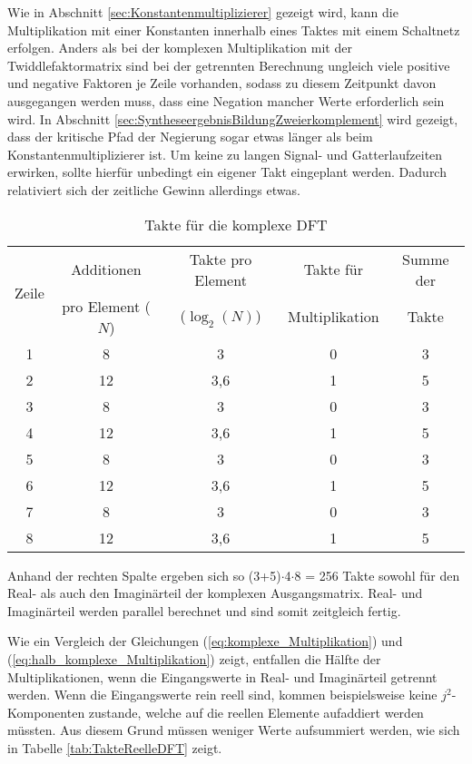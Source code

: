 Wie in Abschnitt \ref{sec:Konstantenmultiplizierer} gezeigt wird, kann die Multiplikation mit einer Konstanten innerhalb eines Taktes mit einem Schaltnetz erfolgen. 
Anders als bei der komplexen Multiplikation mit der Twiddlefaktormatrix sind bei der getrennten Berechnung ungleich viele positive und negative Faktoren je Zeile vorhanden, 
sodass zu diesem Zeitpunkt davon ausgegangen werden muss, dass eine Negation mancher Werte erforderlich sein wird. In Abschnitt
\ref{sec:SyntheseergebnisBildungZweierkomplement} wird gezeigt, dass der kritische Pfad der Negierung sogar etwas länger als beim Konstantenmultiplizierer ist.
Um keine zu langen Signal- und Gatterlaufzeiten erwirken, sollte hierfür unbedingt ein eigener Takt eingeplant werden. Dadurch relativiert sich der zeitliche Gewinn allerdings 
etwas. 


\begin{table}[htbp]
\centering
\caption{Takte für die komplexe DFT}
\label{tab:TakteKomplexeDFT}
\begin{tabular}{ccccc}
\hline
\multirow{2}{*}{Zeile} & Additionen & Takte pro Element & Takte für & Summe der\\
      & pro Element ($N$) & ($\log_2(N)$) & Multiplikation & Takte\\
\hline
 1& 8  & 3   &0 &3\\
 2& 12 & 3,6 &1 &5\\
 3& 8  & 3   &0 &3\\
 4& 12 & 3,6 &1 &5\\
 5& 8  & 3   &0 &3\\
 6& 12 & 3,6 &1 &5\\
 7& 8  & 3   &0 &3\\
 8& 12 & 3,6 &1 &5\\
\hline
\end{tabular}
\end{table}

Anhand der rechten Spalte ergeben sich so (3+5)$\cdot$4$\cdot$8 = 256 Takte sowohl für den Real- als auch den Imaginärteil der komplexen Ausgangsmatrix. Real- und Imaginärteil
werden parallel berechnet und sind somit zeitgleich fertig.

Wie ein Vergleich der Gleichungen (\ref{eq:komplexe_Multiplikation}) und (\ref{eq:halb_komplexe_Multiplikation}) zeigt, entfallen die Hälfte der Multiplikationen, wenn die
Eingangswerte in Real- und Imaginärteil getrennt werden.
Wenn die Eingangswerte rein reell sind, kommen beispielsweise keine $j^2$-Komponenten zustande, welche auf die reellen Elemente aufaddiert werden müssten.
Aus diesem Grund müssen weniger Werte aufsummiert werden, wie sich in Tabelle \ref{tab:TakteReelleDFT} zeigt.

